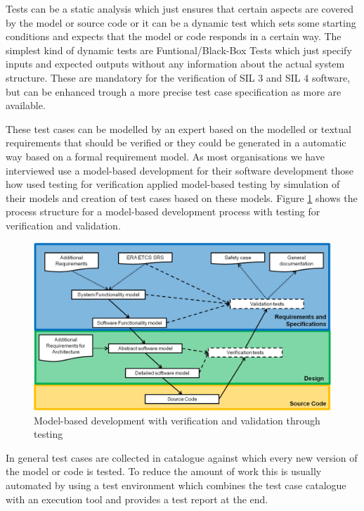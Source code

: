 \documentclass{./template/openetcs_report}
\begin{document}
Tests can be a static analysis which just ensures that certain aspects are covered by the model or source code or it can be a dynamic test which sets some starting conditions and expects that the model or code  responds in a certain way. The simplest kind of dynamic tests are Funtional/Black-Box Tests which just specify inputs and expected outputs without any information about the  actual system structure. These are mandatory for the verification of SIL 3 and SIL 4 software, but can be enhanced trough a more precise test case specification as more are available.

These test cases can be modelled by an expert based on the modelled or textual requirements that should be verified or they could be generated in a automatic way based on a formal requirement model. As most organisations we have interviewed use a model-based development for their software development those how used testing for verification applied model-based testing by simulation of their models and creation of test cases based on these models. Figure \ref{fig: MBD-Testing} shows the process structure for a model-based development process with testing for verification and validation.

\begin{figure}[h]
\centering
\includegraphics[scale=0.6]{Lifecycle-Model-based-Approach-Testing.png}
\caption{Model-based development with verification and validation through testing}
\label{fig: MBD-Testing}
\end{figure}

In general test cases are collected in catalogue against which every new version of the model or code is tested. To reduce the amount of work this is usually automated by using a test environment which combines the test case catalogue with an execution tool and provides a test report at the end.
\end{document}
